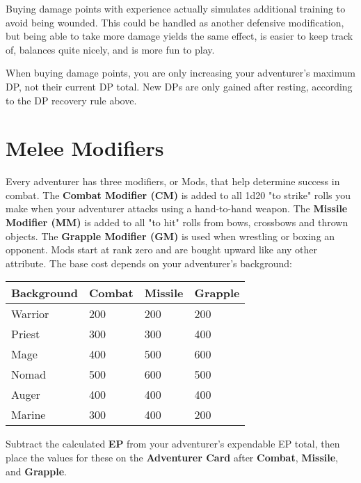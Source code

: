 \begin{multicols*}{2}
Buying damage points with experience actually simulates additional training to avoid being wounded. This could be handled as another defensive modification, but being able to take more damage yields the same effect, is easier to keep track of, balances quite nicely, and is more fun to play.

When buying damage points, you are only increasing your adventurer's maximum DP, not their current DP total. New DPs are only gained after resting, according to the DP recovery rule above.
\section{Melee Modifiers}
Every adventurer has three modifiers, or Mods, that help determine success in combat. The \textbf{Combat Modifier (CM)} is added to all 1d20 "to strike" rolls you make when
your adventurer attacks using a hand-to-hand weapon. The \textbf{Missile Modifier (MM)} is added to all "to hit" rolls from bows, crossbows and thrown objects. The \textbf{Grapple Modifier (GM)} is used when wrestling or boxing an opponent. Mods start at rank zero and are bought upward like any other attribute. The base cost depends on your adventurer's background:

\begin{normbox}
\begin{tabular}{l l l l}
\small
\textbf{Background} & \textbf{Combat} & \textbf{Missile} & \textbf{Grapple}\\
\midrule
Warrior & 200 & 200 & 200\\
Priest & 300 & 300 & 400\\
Mage & 400 & 500 & 600\\
Nomad & 500 & 600 & 500\\
Auger & 400 & 400 & 400\\
Marine & 300 & 400 & 200\\
\end{tabular}
\end{normbox}
\normalsize
Subtract the calculated \textbf{EP} from your adventurer's expendable EP total, then place the values for these on the \textbf{Adventurer Card} after \textbf{Combat}, \textbf{Missile}, and \textbf{Grapple}.

\end{multicols*}
